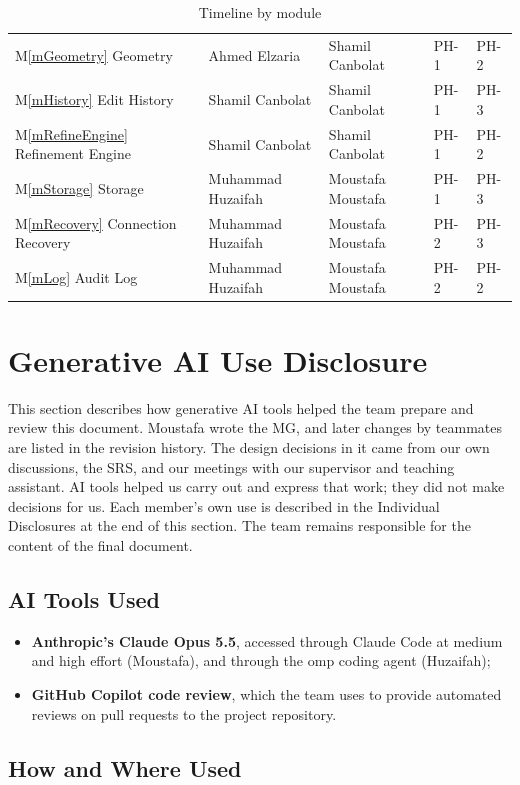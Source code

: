 \documentclass[12pt, titlepage]{article}
\newcommand{\mref}[1]{M\ref{#1}}
\begin{document}
\begin{table}[H]
\begin{tabular}{@{}p{} l l l l@{}}
\mref{mGeometry} Geometry & Ahmed Elzaria & Shamil Canbolat & PH-1 & PH-2\\
\mref{mHistory} Edit History & Shamil Canbolat & Shamil Canbolat & PH-1 & PH-3\\
\mref{mRefineEngine} Refinement Engine &
  Shamil Canbolat & Shamil Canbolat & PH-1 & PH-2\\
\mref{mStorage} Storage & Muhammad Huzaifah & Moustafa Moustafa & PH-1 & PH-3\\
\mref{mRecovery} Connection Recovery &
  Muhammad Huzaifah & Moustafa Moustafa & PH-2 & PH-3\\
\mref{mLog} Audit Log & Muhammad Huzaifah & Moustafa Moustafa & PH-2 & PH-2\\
\bottomrule
\end{tabular}
\caption{Timeline by module}
\label{TblTimeline}
\end{table}

\section{Generative AI Use Disclosure}

This section describes how generative AI tools helped the team prepare and
review this document. Moustafa wrote the MG, and later changes by teammates are
listed in the revision history. The design decisions in it came from our own
discussions, the SRS, and our meetings with our supervisor and teaching
assistant. AI tools helped us carry out and express that work; they did not
make decisions for us. Each member's own use is described in the Individual
Disclosures at the end of this section. The team remains responsible for the
content of the final document.

\subsection{AI Tools Used}

\begin{itemize}
  \item \textbf{Anthropic's Claude Opus 5.5}, accessed through Claude Code at
  medium and high effort (Moustafa), and through the omp coding agent
  (Huzaifah);
  \item \textbf{GitHub Copilot code review}, which the team uses to provide
  automated reviews on pull requests to the project repository.
\end{itemize}

\subsection{How and Where Used}
\end{document}
